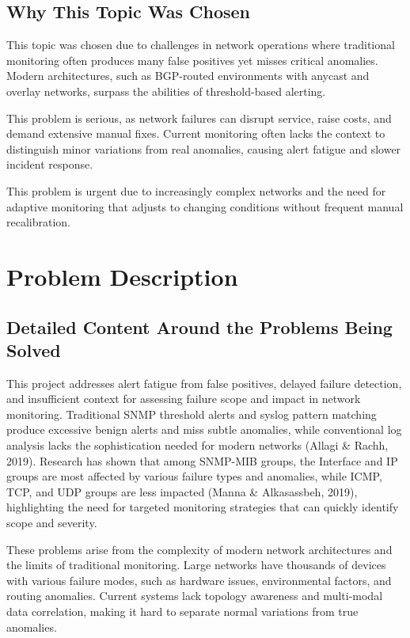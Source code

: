 \documentclass[11pt]{article}
\begin{document}
\subsection{Why This Topic Was Chosen}

This topic was chosen due to challenges in network operations where traditional monitoring often produces many false positives yet misses critical anomalies. Modern architectures, such as BGP-routed environments with anycast and overlay networks, surpass the abilities of threshold-based alerting.

This problem is serious, as network failures can disrupt service, raise costs, and demand extensive manual fixes. Current monitoring often lacks the context to distinguish minor variations from real anomalies, causing alert fatigue and slower incident response.

This problem is urgent due to increasingly complex networks and the need for adaptive monitoring that adjusts to changing conditions without frequent manual recalibration.

\section{Problem Description}

\subsection{Detailed Content Around the Problems Being Solved}

This project addresses alert fatigue from false positives, delayed failure detection, and insufficient context for assessing failure scope and impact in network monitoring. Traditional SNMP threshold alerts and syslog pattern matching produce excessive benign alerts and miss subtle anomalies, while conventional log analysis lacks the sophistication needed for modern networks (Allagi \& Rachh, 2019). Research has shown that among SNMP-MIB groups, the Interface and IP groups are most affected by various failure types and anomalies, while ICMP, TCP, and UDP groups are less impacted (Manna \& Alkasassbeh, 2019), highlighting the need for targeted monitoring strategies that can quickly identify scope and severity.

These problems arise from the complexity of modern network architectures and the limits of traditional monitoring. Large networks have thousands of devices with various failure modes, such as hardware issues, environmental factors, and routing anomalies. Current systems lack topology awareness and multi-modal data correlation, making it hard to separate normal variations from true anomalies.
\end{document}
